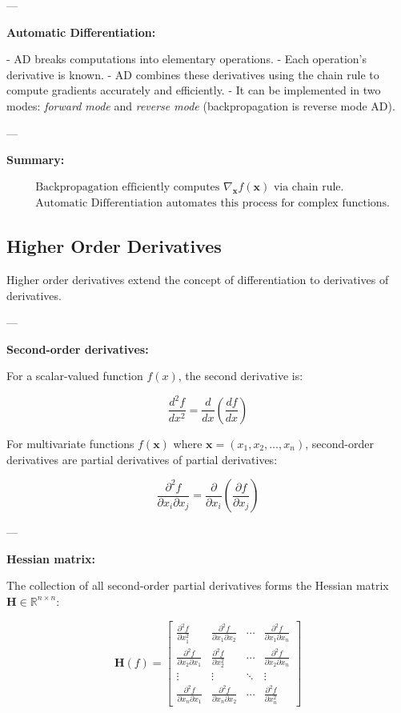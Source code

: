 ---

\textbf{Automatic Differentiation:}

- AD breaks computations into elementary operations.
- Each operation’s derivative is known.
- AD combines these derivatives using the chain rule to compute gradients accurately and efficiently.
- It can be implemented in two modes: \textit{forward mode} and \textit{reverse mode} (backpropagation is reverse mode AD).

---

\textbf{Summary:}

\[
\boxed{
\begin{aligned}
&\text{Backpropagation efficiently computes } \nabla_{\mathbf{x}} f(\mathbf{x}) \text{ via chain rule.} \\
&\text{Automatic Differentiation automates this process for complex functions.}
\end{aligned}
}
\]


\subsection{Higher Order Derivatives}

Higher order derivatives extend the concept of differentiation to derivatives of derivatives.

---

\textbf{Second-order derivatives:}

For a scalar-valued function \( f(x) \), the second derivative is:

\[
\frac{d^2 f}{dx^2} = \frac{d}{dx} \left( \frac{df}{dx} \right)
\]

For multivariate functions \( f(\mathbf{x}) \) where \( \mathbf{x} = (x_1, x_2, \dots, x_n) \), second-order derivatives are partial derivatives of partial derivatives:

\[
\frac{\partial^2 f}{\partial x_i \partial x_j} = \frac{\partial}{\partial x_i} \left( \frac{\partial f}{\partial x_j} \right)
\]

---

\textbf{Hessian matrix:}

The collection of all second-order partial derivatives forms the Hessian matrix \( \mathbf{H} \in \mathbb{R}^{n \times n} \):

\[
\mathbf{H}(f) =
\begin{bmatrix}
\frac{\partial^2 f}{\partial x_1^2} & \frac{\partial^2 f}{\partial x_1 \partial x_2} & \cdots & \frac{\partial^2 f}{\partial x_1 \partial x_n} \\
\frac{\partial^2 f}{\partial x_2 \partial x_1} & \frac{\partial^2 f}{\partial x_2^2} & \cdots & \frac{\partial^2 f}{\partial x_2 \partial x_n} \\
\vdots & \vdots & \ddots & \vdots \\
\frac{\partial^2 f}{\partial x_n \partial x_1} & \frac{\partial^2 f}{\partial x_n \partial x_2} & \cdots & \frac{\partial^2 f}{\partial x_n^2}
\end{bmatrix}
\]

